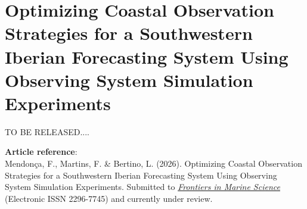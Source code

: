 \chapter{Optimizing Coastal Observation Strategies for a Southwestern Iberian Forecasting System Using Observing System Simulation Experiments} \label{sec:cp3}

TO BE RELEASED....

\vspace{\fill}
\textbf{Article reference}:\\
Mendonça, F., Martins, F. \& Bertino, L. (2026). Optimizing Coastal Observation Strategies for a Southwestern Iberian Forecasting System Using Observing System Simulation Experiments. Submitted to \href{https://www.frontiersin.org/journals/marine-science}{\textit{Frontiers in Marine Science}} (Electronic ISSN 2296-7745) and currently under review.
\newpage
